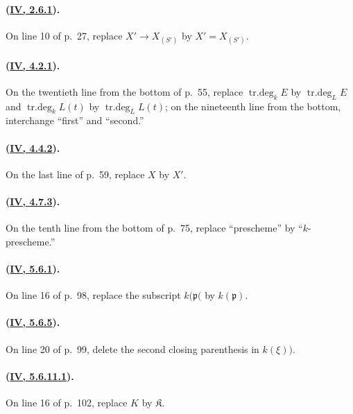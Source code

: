 \paragraph{({\texorpdfstring{\protect\hyperref[IV.2.6.1]{IV, 2.6.1}}{IV, 2.6.1}}).}
On line 10 of p.~27, replace $X'\to X_{(S')}$ by $X'=X_{(S')}$.

\paragraph{({\texorpdfstring{\protect\hyperref[IV.4.2.1]{IV, 4.2.1}}{IV, 4.2.1}}).}
On the twentieth line from the bottom of p.~55, replace
$\operatorname{tr.deg}_kE$ by $\operatorname{tr.deg}_LE$ and
$\operatorname{tr.deg}_kL(t)$ by $\operatorname{tr.deg}_LL(t)$; on the
nineteenth line from the bottom, interchange ``first'' and ``second.''

\paragraph{({\texorpdfstring{\protect\hyperref[IV.4.4.2]{IV, 4.4.2}}{IV, 4.4.2}}).}
On the last line of p.~59, replace $X$ by $X'$.

\paragraph{({\texorpdfstring{\protect\hyperref[IV.4.7.3]{IV, 4.7.3}}{IV, 4.7.3}}).}
On the tenth line from the bottom of p.~75, replace ``prescheme'' by
``$k$-prescheme.''

\paragraph{({\texorpdfstring{\protect\hyperref[IV.5.6.1]{IV, 5.6.1}}{IV, 5.6.1}}).}
On line 16 of p.~98, replace the subscript $k(\mathfrak p($ by
$k(\mathfrak p)$.

\paragraph{({\texorpdfstring{\protect\hyperref[IV.5.6.5]{IV, 5.6.5}}{IV, 5.6.5}}).}
On line 20 of p.~99, delete the second closing parenthesis in $k(\xi))$.

\paragraph{({\texorpdfstring{\protect\hyperref[IV.5.6.11.1]{IV, 5.6.11.1}}{IV, 5.6.11.1}}).}
On line 16 of p.~102, replace $K$ by $\mathfrak K$.


